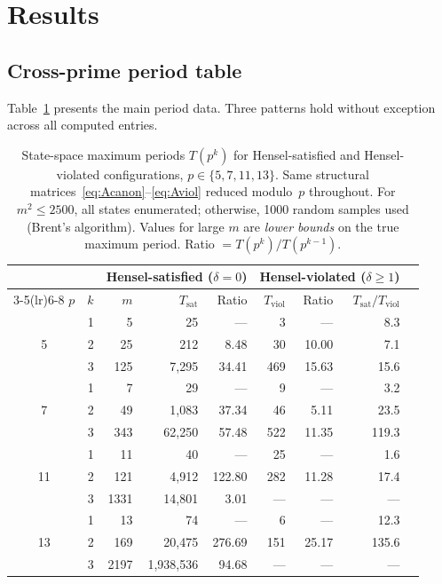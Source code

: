 \documentclass[11pt]{article}
\theoremstyle{plain}
\theoremstyle{definition}
\begin{document}
\section{Results}
\label{sec:results}

\subsection{Cross-prime period table}
\label{sec:results:period}

Table~\ref{tab:periods} presents the main period data. Three patterns hold without exception across all computed entries.

\begin{table}[ht]
\centering
\caption{State-space maximum periods $T(p^k)$ for Hensel-satisfied and Hensel-violated configurations, $p \in \{5,7,11,13\}$. Same structural matrices~\eqref{eq:Acanon}--\eqref{eq:Aviol} reduced modulo~$p$ throughout. For $m^2 \leq 2500$, all states enumerated; otherwise, 1000 random samples used (Brent's algorithm). Values for large $m$ are \emph{lower bounds} on the true maximum period. Ratio $= T(p^k)/T(p^{k-1})$.}
\label{tab:periods}
\medskip
\setlength{\tabcolsep}{5.5pt}
\begin{tabular}{@{}crrrrrrrr@{}}
\toprule
 & & \multicolumn{3}{c}{Hensel-satisfied ($\delta=0$)} & \multicolumn{3}{c}{Hensel-violated ($\delta\geq 1$)} & \\
\cmidrule(lr){3-5}\cmidrule(lr){6-8}
$p$ & $k$ & $m$ & $T_{\mathrm{sat}}$ & Ratio & $T_{\mathrm{viol}}$ & Ratio & $T_{\mathrm{sat}}/T_{\mathrm{viol}}$\\
\midrule
\multirow{3}{*}{5}
  & 1 & 5   & 25        & ---   & 3    & ---   & 8.3\\
  & 2 & 25  & 212       & 8.48  & 30   & 10.00 & 7.1\\
  & 3 & 125 & 7{,}295   & 34.41 & 469  & 15.63 & 15.6\\
\midrule
\multirow{3}{*}{7}
  & 1 & 7   & 29         & ---   & 9    & ---   & 3.2\\
  & 2 & 49  & 1{,}083    & 37.34 & 46   & 5.11  & 23.5\\
  & 3 & 343 & 62{,}250   & 57.48 & 522  & 11.35 & 119.3\\
\midrule
\multirow{3}{*}{11}
  & 1 & 11  & 40          & ---    & 25   & ---   & 1.6\\
  & 2 & 121 & 4{,}912     & 122.80 & 282  & 11.28 & 17.4\\
  & 3 & 1331 & 14{,}801   & 3.01   & ---  & ---   & ---\\
\midrule
\multirow{3}{*}{13}
  & 1 & 13  & 74           & ---    & 6    & ---   & 12.3\\
  & 2 & 169 & 20{,}475     & 276.69 & 151  & 25.17 & 135.6\\
  & 3 & 2197 & 1{,}938{,}536 & 94.68 & ---  & ---   & ---\\
\bottomrule
\end{tabular}
\end{table}
\end{document}
